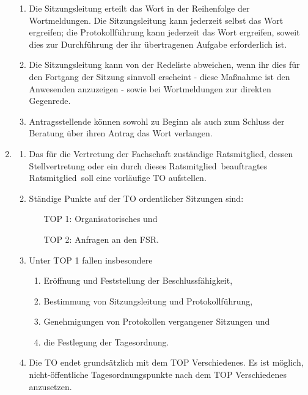 \documentclass[a4paper, 12pt, ngerman]{article}
\newcommand{\rat}{FSR}
\newcommand{\mitglied}{Ratsmitglied}
\begin{document}
\begin{enumerate}[leftmargin=0cm]
	\begin{enumerate}[leftmargin=0cm]
		\item Die Sitzungsleitung erteilt das Wort in der Reihenfolge der Wortmeldungen. Die Sitzungsleitung kann
		jederzeit selbst das Wort ergreifen; die Protokollführung kann jederzeit das Wort ergreifen, soweit dies zur Durchführung der ihr übertragenen Aufgabe erforderlich ist.
		\item Die Sitzungsleitung kann von der Redeliste abweichen, wenn
		ihr dies für den Fortgang der Sitzung sinnvoll erscheint
		- diese Maßnahme ist den Anwesenden anzuzeigen - sowie bei
		Wortmeldungen zur direkten Gegenrede.
		\item Antragsstellende können sowohl zu Beginn als auch zum Schluss der Beratung über ihren
		Antrag das Wort verlangen.
	\end{enumerate}
	
	\item {} \label{tagesordnung}
	
	\begin{enumerate}[leftmargin=0cm]
		\item Das für die Vertretung der Fachschaft zuständige Ratsmitglied, dessen Stellvertretung oder ein durch dieses \mitglied~beauftragtes \mitglied~soll eine vorläufige TO aufstellen.
		\item Ständige Punkte auf der TO ordentlicher Sitzungen sind:
		\begin{enumerate}[leftmargin=1.4cm]
			\item[TOP 1:] Organisatorisches und
			\item[TOP 2:] Anfragen an den \rat.
		\end{enumerate}
		\item Unter TOP 1 fallen insbesondere
		\begin{enumerate}[leftmargin=0.5cm]
			\item Eröffnung und Feststellung der Beschlussfähigkeit,
			\item Bestimmung von Sitzungsleitung und Protokollführung,
			\item Genehmigungen von Protokollen vergangener Sitzungen und
			\item die Festlegung der Tagesordnung.
		\end{enumerate}
		\item Die TO endet grundsätzlich mit dem TOP Verschiedenes. Es ist möglich, nicht-öffentliche Tagesordnungspunkte nach dem TOP Verschiedenes anzusetzen.
	\end{enumerate}
	

\end{enumerate}
\end{document}
